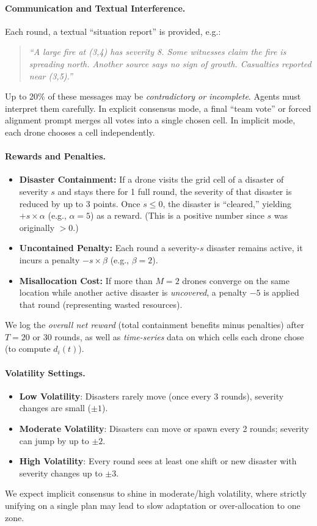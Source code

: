 \paragraph{Communication and Textual Interference.}
Each round, a textual “situation report” is provided, e.g.:
\begin{quote}
\small
\emph{``A large fire at (3,4) has severity 8. Some witnesses claim the fire is spreading north. Another source says no sign of growth. Casualties reported near (3,5).''}
\normalsize
\end{quote}
Up to 20\% of these messages may be \emph{contradictory or incomplete}. Agents must interpret them carefully. In explicit consensus mode, a final “team vote” or forced alignment prompt merges all votes into a single chosen cell. In implicit mode, each drone chooses a cell independently.

\paragraph{Rewards and Penalties.}
\begin{itemize}
    \item \textbf{Disaster Containment:} If a drone visits the grid cell of a disaster of severity $s$ and stays there for 1 full round, the severity of that disaster is reduced by up to 3 points. Once $s\le0$, the disaster is “cleared,” yielding $+s \times \alpha$ (e.g., $\alpha=5$) as a reward. (This is a positive number since $s$ was originally $>0$.)
    \item \textbf{Uncontained Penalty:} Each round a severity-$s$ disaster remains active, it incurs a penalty $-s \times \beta$ (e.g., $\beta=2$).
    \item \textbf{Misallocation Cost:} If more than $M=2$ drones converge on the same location while another active disaster is \emph{uncovered}, a penalty $-5$ is applied that round (representing wasted resources).
\end{itemize}
We log the \emph{overall net reward} (total containment benefits minus penalties) after $T=20$ or $30$ rounds, as well as \emph{time-series} data on which cells each drone chose (to compute $d_i(t)$).

\paragraph{Volatility Settings.}
\begin{itemize} [itemsep=1pt, parsep=1pt, leftmargin=*]
    \item \textbf{Low Volatility}: Disasters rarely move (once every 3 rounds), severity changes are small ($\pm1$). 
    \item \textbf{Moderate Volatility}: Disasters can move or spawn every 2 rounds; severity can jump by up to $\pm2$.
    \item \textbf{High Volatility}: Every round sees at least one shift or new disaster with severity changes up to $\pm3$.
\end{itemize}
We expect implicit consensus to shine in moderate/high volatility, where strictly unifying on a single plan may lead to slow adaptation or over-allocation to one zone.

